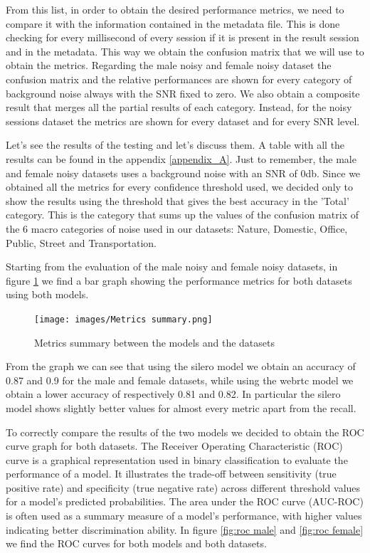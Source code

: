 \documentclass[../main.tex]{subfiles}
\begin{document}
From this list, in order to obtain the desired performance metrics, we need to compare it with the information contained in the metadata file. This is done checking for every millisecond of every session if it is present in the result session and in the metadata. This way we obtain the confusion matrix that we will use to obtain the metrics. Regarding the male noisy and female noisy dataset the confusion matrix and the relative performances are shown for every category of background noise always with the SNR fixed to zero. We also obtain a composite result that merges all the partial results of each category. Instead, for the noisy sessions dataset the metrics are shown for every dataset and for every SNR level.

Let's see the results of the testing and let's discuss them. A table with all the results can be found in the appendix \ref{appendix_A}.
Just to remember, the male and female noisy datasets uses a background noise with an SNR of 0db. Since we obtained all the metrics for every confidence threshold used, we decided only to show the results using the threshold that gives the best accuracy in the 'Total' category. This is the category that sums up the values of the confusion matrix of the 6 macro categories of noise used in our datasets: Nature, Domestic, Office, Public, Street and Transportation. 

Starting from the evaluation of the male noisy and female noisy datasets, in figure \ref{fig:metrics summary} we find a bar graph showing the performance metrics for both datasets using both models.   

\begin{figure}[ht]
    \centering
    \texttt{[image: images/Metrics summary.png]}
    \caption{Metrics summary between the models and the datasets}
    \label{fig:metrics summary}
\end{figure}

From the graph we can see that using the silero model we obtain an accuracy of 0.87 and 0.9 for the male and female datasets, while using the webrtc model we obtain a lower accuracy of respectively 0.81 and 0.82. In particular the silero model shows slightly better values for almost every metric apart from the recall. 

To correctly compare the results of the two models we decided to obtain the ROC curve graph for both datasets. The Receiver Operating Characteristic (ROC) curve is a graphical representation used in binary classification to evaluate the performance of a model. It illustrates the trade-off between sensitivity (true positive rate) and specificity (true negative rate) across different threshold values for a model's predicted probabilities. The area under the ROC curve (AUC-ROC) is often used as a summary measure of a model's performance, with higher values indicating better discrimination ability. In figure \ref{fig:roc male} and \ref{fig:roc female} we find the ROC curves for both models and both datasets.
\end{document}
